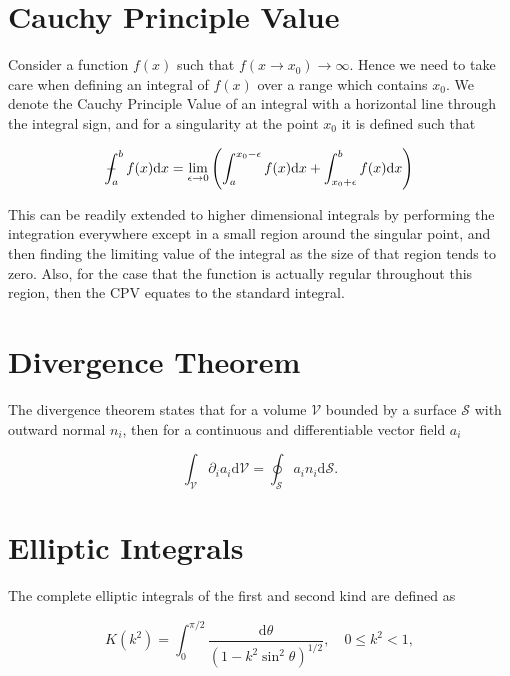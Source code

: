 \documentclass[12pt]{article}
\def\Xint#1{\mathchoice
{\XXint\displaystyle\textstyle{#1}}%
{\XXint\textstyle\scriptstyle{#1}}%
{\XXint\scriptstyle\scriptscriptstyle{#1}}%
{\XXint\scriptscriptstyle\scriptscriptstyle{#1}}%
\!\int}
\def\XXint#1#2#3{{\setbox0=\hbox{$#1{#2#3}{\int}$}
\vcenter{\hbox{$#2#3$}}\kern-.5\wd0}}
\def\dashint{\Xint-}
\begin{document}
\section{Cauchy Principle Value}
\label{app:CPV}

Consider a function $f(x)$ such that $f(x \to x_{0}) \to \infty$. Hence we need to take care when defining an integral of $f(x)$ over a range which contains $x_{0}$. We denote the Cauchy Principle Value of an integral with a horizontal line through the integral sign, and for a singularity at the point $x_{0}$ it is defined such that \citep{Boas83}

\begin{equation}
\label{equ:CPV}
\dashint_{a}^{b} f(x) \mathrm{d}x = \lim_{\epsilon \to 0} \left( \int_{a}^{x_{0} - \epsilon} f(x) \mathrm{d}x + \int_{x_{0} + \epsilon}^{b} f(x) \mathrm{d}x \right)
\end{equation}

This can be readily extended to higher dimensional integrals by performing the integration everywhere except in a small region around the singular point, and then finding the limiting value of the integral as the size of that region tends to zero. Also, for the case that the function is actually regular throughout this region, then the CPV equates to the standard integral.


\section{Divergence Theorem}
\label{app:div_theory}

The divergence theorem states that for a volume $\mathcal{V}$ bounded by a surface $\mathcal{S}$ with outward normal $n_{i}$, then for a continuous and differentiable vector field $a_{i}$ \citep{Riley06}

\begin{equation}
\label{equ:div_theory}
\int_{\mathcal{V}} \partial_{i} a_{i} \mathrm{d} \mathcal{V} = \oint_{\mathcal{S}} a_{i} n_{i} \mathrm{d} \mathcal{S}.
\end{equation}

\section{Elliptic Integrals}
\label{app:ellip}

The complete elliptic integrals of the first and second kind are defined as \citep{Abramowitz72}

\begin{equation}
\label{equ:ellip1}
K(k^{2}) = \int_{0}^{\pi/2} \frac{\mathrm{d}\theta}{(1 - k^{2} \sin^{2}\theta)^{1/2}}, \quad 0 \leq k^{2} < 1,
\end{equation}
\end{document}
